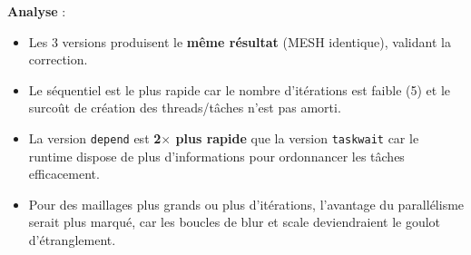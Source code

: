 \documentclass[12pt,a4paper]{article}
\begin{document}
\textbf{Analyse} :
\begin{itemize}
  \item Les 3 versions produisent le \textbf{même résultat} (MESH identique),
    validant la correction.
  \item Le séquentiel est le plus rapide car le nombre d'itérations est faible
    (5) et le surcoût de création des threads/tâches n'est pas amorti.
  \item La version \texttt{depend} est \textbf{2$\times$ plus rapide} que la
    version \texttt{taskwait} car le runtime dispose de plus d'informations pour
    ordonnancer les tâches efficacement.
  \item Pour des maillages plus grands ou plus d'itérations, l'avantage du
    parallélisme serait plus marqué, car les boucles de blur et scale
    deviendraient le goulot d'étranglement.
\end{itemize}
\end{document}
